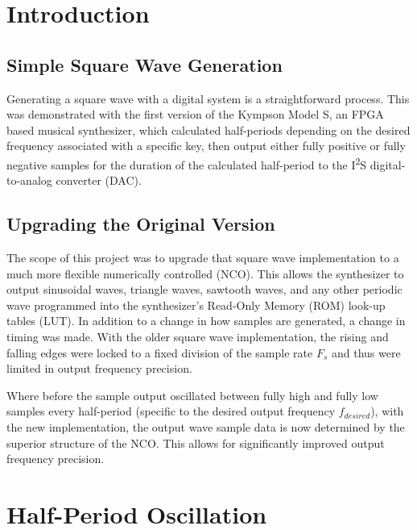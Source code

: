 \documentclass[conference]{IEEEtran}
\begin{document}
\section{Introduction}

\subsection{Simple Square Wave Generation}
Generating a square wave with a digital system is a straightforward process. This was demonstrated with the first version of the Kympson Model S, an FPGA based musical synthesizer, which calculated half-periods depending on the desired frequency associated with a specific key, then output either fully positive or fully negative samples for the duration of the calculated half-period to the I\textsuperscript{2}S digital-to-analog converter (DAC).

\subsection{Upgrading the Original Version}
The scope of this project was to upgrade that square wave implementation to a much more flexible numerically controlled (NCO). This allows the synthesizer to output sinusoidal waves, triangle waves, sawtooth waves, and any other periodic wave programmed into the synthesizer's Read-Only Memory (ROM) look-up tables (LUT). In addition to a change in how samples are generated, a change in timing was made. With the older square wave implementation, the rising and falling edges were locked to a fixed division of the sample rate $F_s$ and thus were limited in output frequency precision.

Where before the sample output oscillated between fully high and fully low samples every half-period (specific to the desired output frequency $f_{desired}$), with the new implementation, the output wave sample data is now determined by the superior structure of the NCO. This allows for significantly improved output frequency precision.

\section{Half-Period Oscillation}
\end{document}
